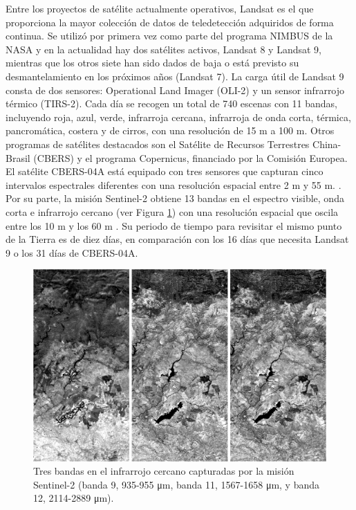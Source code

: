 Entre los proyectos de satélite actualmente operativos, Landsat es el que proporciona la mayor colección de datos de teledetección adquiridos de forma continua. Se utilizó por primera vez como parte del programa NIMBUS de la NASA y en la actualidad hay dos satélites activos, Landsat 8 y Landsat 9, mientras que los otros siete han sido dados de baja o está previsto su desmantelamiento en los próximos años (Landsat 7). La carga útil de Landsat 9 consta de dos sensores: Operational Land Imager (OLI-2) y un sensor infrarrojo térmico (TIRS-2). Cada día se recogen un total de 740 escenas con 11 bandas, incluyendo roja, azul, verde, infrarroja cercana, infrarroja de onda corta, térmica, pancromática, costera y de cirros, con una resolución de 15 \si{\meter} a 100 \si{\meter}. Otros programas de satélites destacados son el Satélite de Recursos Terrestres China-Brasil (CBERS) y el programa Copernicus, financiado por la Comisión Europea. El satélite CBERS-04A está equipado con tres sensores que capturan cinco intervalos espectrales diferentes con una resolución espacial entre 2 \si{\meter} y 55 \si{\meter}. \cite{instituto_nacional_de_pesquisas_espaciais_inpecbers_2019}. Por su parte, la misión Sentinel-2 obtiene 13 bandas en el espectro visible, onda corta e infrarrojo cercano (ver Figura \ref{fig:sentinel2_spanish}) con una resolución espacial que oscila entre los 10 \si{\meter} y los 60 \si{\meter} \cite{european_environment_agency_eu_2017}. Su periodo de tiempo para revisitar el mismo punto de la Tierra es de diez días, en comparación con los 16 días que necesita Landsat 9 o los 31 días de CBERS-04A.

\begin{figure}[!ht]
	\includegraphics{figs/introduction/sentinel2_bands.png}
	\caption{Tres bandas en el infrarrojo cercano capturadas por la misión Sentinel-2 (banda 9, 935-955 \si{\micro\meter}, banda 11, 1567-1658 \si{\micro\meter}, y banda 12, 2114-2889 \si{\micro\meter}). }
    \label{fig:sentinel2_spanish}
\end{figure}

